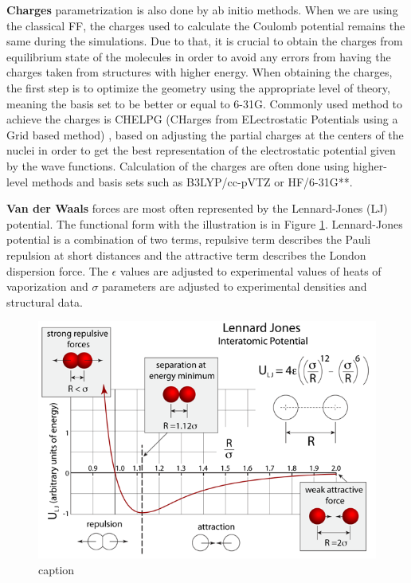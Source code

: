 \textbf{Charges} parametrization is also done by ab initio methods. When we are using the classical FF, the charges used to calculate the Coulomb potential remains the same during the simulations. Due to that, it is crucial to obtain the charges from equilibrium state of the molecules in order to avoid any errors from having the charges taken from structures with higher energy. When obtaining the charges, the first step is to optimize the geometry using the appropriate level of theory, meaning the basis set to be better or equal to 6-31G. Commonly used method to achieve the charges is CHELPG (CHarges from ELectrostatic Potentials using a Grid based method) \cite{breneman_determining_1990}, based on adjusting the partial charges at the centers of the nuclei in order to get the best representation of the electrostatic potential given by the wave functions. Calculation of the charges are often done using higher-level methods and basis sets such as B3LYP/cc-pVTZ or HF/6-31G**.

\textbf{Van der Waals} forces are most often represented by the Lennard-Jones (LJ) potential. The functional form with the illustration is in Figure \ref{fig:lj}. Lennard-Jones potential is a combination of two terms, repulsive term describes the Pauli repulsion at short distances and the attractive term describes the London dispersion force. The $\epsilon$ values are adjusted to experimental values of heats of vaporization and $\sigma$ parameters are adjusted to experimental densities and structural data. 

\begin{figure}[htb!]
	\centering
	\includegraphics[width=1.0\linewidth]{img/lj.png} 
	\caption{caption}
	\label{fig:lj}    
\end{figure} 


